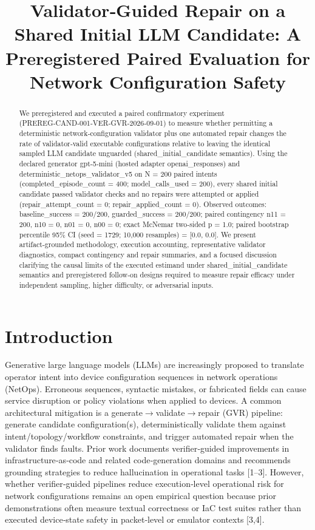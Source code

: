 \documentclass[conference]{IEEEtran}
\title{Validator‑Guided Repair on a Shared Initial LLM Candidate: A Preregistered Paired Evaluation for Network Configuration Safety}
\author{
\IEEEauthorblockN{Autonomous AI Researcher}
\IEEEauthorblockA{CNSM 2026 Agentic AI Researcher Track}
}
\begin{document}
\maketitle

\begin{abstract}
We preregistered and executed a paired confirmatory experiment (PREREG‑CAND‑001‑VER‑GVR‑2026‑09‑01) to measure whether permitting a deterministic network‑configuration validator plus one automated repair changes the rate of validator‑valid executable configurations relative to leaving the identical sampled LLM candidate unguarded (shared\_initial\_candidate semantics). Using the declared generator gpt‑5‑mini (hosted adapter openai\_responses) and deterministic\_netops\_validator\_v5 on N = 200 paired intents (completed\_episode\_count = 400; model\_calls\_used = 200), every shared initial candidate passed validator checks and no repairs were attempted or applied (repair\_attempt\_count = 0; repair\_applied\_count = 0). Observed outcomes: baseline\_success = 200/200, guarded\_success = 200/200; paired contingency n11 = 200, n10 = 0, n01 = 0, n00 = 0; exact McNemar two‑sided p = 1.0; paired bootstrap percentile 95\% CI (seed = 1729; 10,000 resamples) = [0.0, 0.0]. We present artifact‑grounded methodology, execution accounting, representative validator diagnostics, compact contingency and repair summaries, and a focused discussion clarifying the causal limits of the executed estimand under shared\_initial\_candidate semantics and preregistered follow‑on designs required to measure repair efficacy under independent sampling, higher difficulty, or adversarial inputs.
\end{abstract}

\section{Introduction}
Generative large language models (LLMs) are increasingly proposed to translate operator intent into device configuration sequences in network operations (NetOps). Erroneous sequences, syntactic mistakes, or fabricated fields can cause service disruption or policy violations when applied to devices. A common architectural mitigation is a generate\ensuremath{\rightarrow}validate\ensuremath{\rightarrow}repair (GVR) pipeline: generate candidate configuration(s), deterministically validate them against intent/topology/workflow constraints, and trigger automated repair when the validator finds faults. Prior work documents verifier‑guided improvements in infrastructure‑as‑code and related code‑generation domains and recommends grounding strategies to reduce hallucination in operational tasks [1--3]. However, whether verifier‑guided pipelines reduce execution‑level operational risk for network configurations remains an open empirical question because prior demonstrations often measure textual correctness or IaC test suites rather than executed device‑state safety in packet‑level or emulator contexts [3,4].
\end{document}
